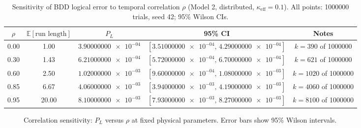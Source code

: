 \documentclass[conference]{IEEEtran}
\newcommand{\nexact}[1]{\num[round-mode=off]{#1}}
\newcommand{\simtrials}{1000000}
\newcommand{\simseed}{42}
\newcommand{\simrhoB}{0.60}
\newcommand{\simpLB}{1.02000000e-03}
\newcommand{\simpLBlo}{9.60000000e-04}
\newcommand{\simpLBhi}{1.08000000e-03}
\newcommand{\simkB}{1020}
\newcommand{\simrhoD}{0.00}
\newcommand{\simpLD}{3.90000000e-04}
\newcommand{\simpLDlo}{3.51000000e-04}
\newcommand{\simpLDhi}{4.29000000e-04}
\newcommand{\simkD}{390}
\newcommand{\simrhoA}{0.30}
\newcommand{\simpLA}{6.21000000e-04}
\newcommand{\simpLAlo}{5.72000000e-04}
\newcommand{\simpLAhi}{6.70000000e-04}
\newcommand{\simkA}{621}
\newcommand{\simrhoC}{0.85}
\newcommand{\simpLC}{4.06000000e-03}
\newcommand{\simpLClo}{3.94000000e-03}
\newcommand{\simpLChi}{4.19000000e-03}
\newcommand{\simkC}{4060}
\newcommand{\simrhoE}{0.95}
\newcommand{\simpLE}{8.10000000e-03}
\newcommand{\simpLElo}{7.93000000e-03}
\newcommand{\simpLEhi}{8.27000000e-03}
\newcommand{\simkE}{8100}
\newcommand{\eLDlo}{3.90000000e-05}
\newcommand{\eLDhi}{3.90000000e-05}
\newcommand{\eLAlo}{4.90000000e-05}
\newcommand{\eLAhi}{4.90000000e-05}
\newcommand{\eLBlo}{6.00000000e-05}
\newcommand{\eLBhi}{6.00000000e-05}
\newcommand{\eLClo}{1.20000000e-04}
\newcommand{\eLChi}{1.30000000e-04}
\newcommand{\eLElo}{1.70000000e-04}
\newcommand{\eLEhi}{1.70000000e-04}
\begin{document}
\begin{table}[t!]
\small
\centering
\caption{Sensitivity of BDD logical error to temporal correlation \(\rho\) (Model 2, distributed, \(\kappa_{\mathrm{eff}}=0.1\)). All points: \simtrials{} trials, seed \simseed; 95\% Wilson CIs.}
\label{tab:sensitivity}
\begin{adjustbox}{width=\linewidth}
\begin{tabular}{ccccc}
\toprule
\(\rho\) & \(\mathbb{E}[\text{run length}]\) & \(P_L\) & 95\% CI & Notes \\
\midrule
\simrhoD & 1.00 & \(\nexact{\simpLD}\) & \([\nexact{\simpLDlo},\,\nexact{\simpLDhi}]\) & \(k=\simkD\) of \simtrials \\
\simrhoA & 1.43 & \(\nexact{\simpLA}\) & \([\nexact{\simpLAlo},\,\nexact{\simpLAhi}]\) & \(k=\simkA\) of \simtrials \\
\simrhoB & 2.50 & \(\nexact{\simpLB}\) & \([\nexact{\simpLBlo},\,\nexact{\simpLBhi}]\) & \(k=\simkB\) of \simtrials \\
\simrhoC & 6.67 & \(\nexact{\simpLC}\) & \([\nexact{\simpLClo},\,\nexact{\simpLChi}]\) & \(k=\simkC\) of \simtrials \\
\simrhoE & 20.00 & \(\nexact{\simpLE}\) & \([\nexact{\simpLElo},\,\nexact{\simpLEhi}]\) & \(k=\simkE\) of \simtrials \\
\bottomrule
\end{tabular}
\end{adjustbox}
\end{table}

\begin{figure}[t!]
\centering
\begin{adjustbox}{width=\linewidth}
\end{adjustbox}
\caption{Correlation sensitivity: \(P_L\) versus \(\rho\) at fixed physical parameters. Error bars show 95\% Wilson intervals.}
\label{fig:plrho}
\end{figure}
\end{document}
